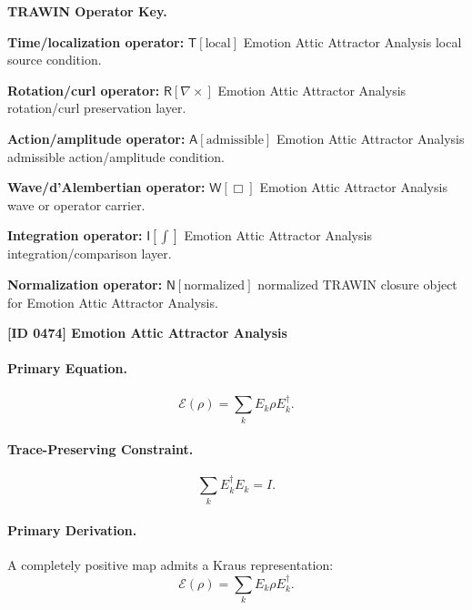 \par\vspace{0.45\baselineskip}
\noindent\begin{minipage}[t]{\linewidth}
\begingroup
\small
\raggedright
\textbf{TRAWIN Operator Key.}\par
\noindent\textbf{Time/localization operator:} $\mathsf{T}\!\left[\mathrm{local}\right]$ Emotion Attic Attractor Analysis local source condition.\par
\noindent\textbf{Rotation/curl operator:} $\mathsf{R}\!\left[\nabla\times\right]$ Emotion Attic Attractor Analysis rotation/curl preservation layer.\par
\noindent\textbf{Action/amplitude operator:} $\mathsf{A}\!\left[\mathrm{admissible}\right]$ Emotion Attic Attractor Analysis admissible action/amplitude condition.\par
\noindent\textbf{Wave/d'Alembertian operator:} $\mathsf{W}\!\left[\Box\right]$ Emotion Attic Attractor Analysis wave or operator carrier.\par
\noindent\textbf{Integration operator:} $\mathsf{I}\!\left[\int\right]$ Emotion Attic Attractor Analysis integration/comparison layer.\par
\noindent\textbf{Normalization operator:} $\mathsf{N}\!\left[\mathrm{normalized}\right]$ normalized TRAWIN closure object for Emotion Attic Attractor Analysis.\par
\endgroup
\end{minipage}

\clearpage
\noindent\textbf{[ID 0474] Emotion Attic Attractor Analysis}\par
\vspace{0.35em}
\paragraph{Primary Equation.}
\begin{equation}
\mathcal{E}(\rho)=\sum_k E_k\rho E_k^\dagger .
\end{equation}

\paragraph{Trace-Preserving Constraint.}
\begin{equation}
\sum_k E_k^\dagger E_k = I .
\end{equation}

\paragraph{Primary Derivation.}
A completely positive map admits a Kraus representation:
\begin{equation}
\mathcal{E}(\rho)=\sum_k E_k\rho E_k^\dagger .
\end{equation}

